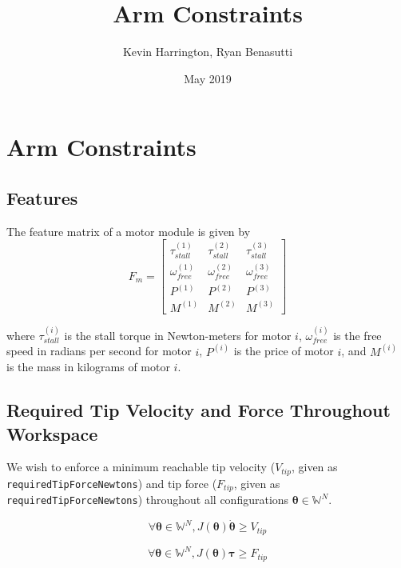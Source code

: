 \documentclass{article}
\title{Arm Constraints}
\author{Kevin Harrington, Ryan Benasutti}
\date{May 2019}
\begin{document}
\maketitle

\FloatBarrier
\section{Arm Constraints}

\FloatBarrier
\subsection{Features}

The feature matrix of a motor module is given by
\begin{equation}
    F_m =
    \begin{bmatrix}
        \tau_{stall}^{(1)} & \tau_{stall}^{(2)} & \tau_{stall}^{(3)} \\[6pt]
        \omega_{free}^{(1)} & \omega_{free}^{(2)} & \omega_{free}^{(3)} \\[6pt]
        P^{(1)} & P^{(2)} & P^{(3)} \\[6pt]
        M^{(1)} & M^{(2)} & M^{(3)}
    \end{bmatrix}
\end{equation}

where $\tau_{stall}^{(i)}$ is the stall torque in Newton-meters for motor $i$, $\omega_{free}^{(i)}$
is the free speed in radians per second for motor $i$, $P^{(i)}$ is the price of motor $i$, and
$M^{(i)}$ is the mass in kilograms of motor $i$.

\FloatBarrier
\subsection{Required Tip Velocity and Force Throughout Workspace}

We wish to enforce a minimum reachable tip velocity ($V_{tip}$, given as
\texttt{requiredTipForceNewtons}) and tip force ($F_{tip}$, given as
\texttt{requiredTipForceNewtons}) throughout all configurations $\boldsymbol{\theta} \in
\mathbb{W}^N$.

\begin{equation}
    \forall \boldsymbol{\theta} \in \mathbb{W}^N, J(\boldsymbol{\theta}) \boldsymbol{\dot{\theta}} \geq V_{tip}
    \label{eq:vtip_constraint}
\end{equation}

\begin{equation}
    \forall \boldsymbol{\theta} \in \mathbb{W}^N, J(\boldsymbol{\theta}) \boldsymbol{\tau} \geq F_{tip}
    \label{eq:ftip_constraint}
\end{equation}
\end{document}
